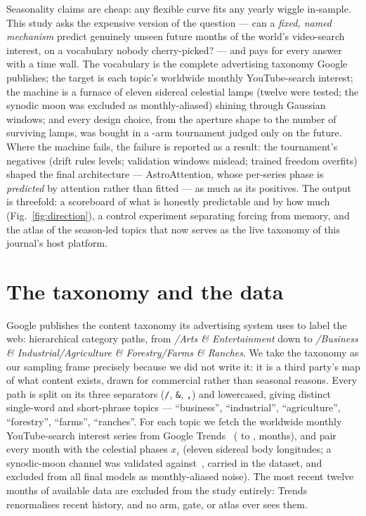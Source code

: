 \documentclass[11pt]{artaquest}
\begin{document}
Seasonality claims are cheap: any flexible curve fits any yearly wiggle in-sample. This study
asks the expensive version of the question --- can a \emph{fixed, named mechanism} predict
genuinely unseen future months of the world's video-search interest, on a vocabulary nobody
cherry-picked? --- and pays for every answer with a time wall. The vocabulary is the complete
advertising taxonomy Google publishes; the target is each topic's worldwide monthly
YouTube-search interest; the machine is a furnace of eleven sidereal celestial lamps (twelve were tested; the synodic moon was excluded as monthly-aliased) shining through
Gaussian windows; and every design choice, from the aperture shape to the number of surviving
lamps, was bought in a \nArms{}-arm tournament judged only on the future. Where the machine
fails, the failure is reported as a result: the tournament's negatives (drift rules levels;
validation windows mislead; trained freedom overfits) shaped the final architecture ---
AstroAttention, whose per-series phase is \emph{predicted} by attention rather than fitted ---
as much as its positives. The output is threefold: a scoreboard of what is honestly predictable
and by how much (Fig.~\ref{fig:direction}), a control experiment separating forcing from memory,
and the atlas of the \seasonLed{} season-led topics that now serves as the live taxonomy of this
journal's host platform.

\section{The taxonomy and the data}

Google publishes the content taxonomy its advertising system uses to label the web: \nPaths{}
hierarchical category paths, from \emph{/Arts \& Entertainment} down to
\emph{/Business \& Industrial/Agriculture \& Forestry/Farms \& Ranches}. We take the taxonomy as
our sampling frame precisely because we did not write it: it is a third party's map of what
content exists, drawn for commercial rather than seasonal reasons. Every path is split on its
three separators (\texttt{/}, \texttt{\&}, \texttt{,}) and lowercased, giving \nVocab{} distinct
single-word and short-phrase topics --- ``business'', ``industrial'', ``agriculture'',
``forestry'', ``farms'', ``ranches''. For each topic we fetch the worldwide monthly YouTube-search
interest series from Google Trends~\citep{choi2012predicting} (\winStart{} to \winEnd{}, \nMonths{} months), and pair every
month with the celestial phases $x_i$ (eleven sidereal body longitudes; a synodic-moon channel was validated against~\citealt{meeus1998astronomical}, carried in the dataset, and excluded from all final models as monthly-aliased noise). The most recent twelve months of available data are excluded from the study
entirely: Trends renormalises recent history, and no arm, gate, or atlas ever sees them.
\end{document}
